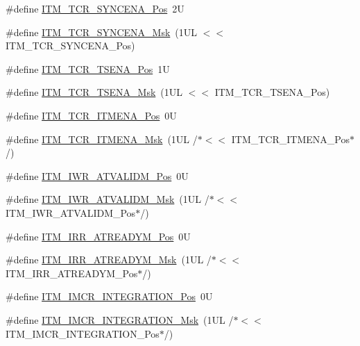 \begin{DoxyCompactItemize}
\#define \hyperlink{group___c_m_s_i_s___i_t_m_gaa93a1147a39fc63980d299231252a30e}{I\+T\+M\+\_\+\+T\+C\+R\+\_\+\+S\+Y\+N\+C\+E\+N\+A\+\_\+\+Pos}~2U
\item 
\#define \hyperlink{group___c_m_s_i_s___i_t_m_gac89b74a78701c25b442105d7fe2bbefb}{I\+T\+M\+\_\+\+T\+C\+R\+\_\+\+S\+Y\+N\+C\+E\+N\+A\+\_\+\+Msk}~(1\+U\+L $<$$<$ I\+T\+M\+\_\+\+T\+C\+R\+\_\+\+S\+Y\+N\+C\+E\+N\+A\+\_\+\+Pos)
\item 
\#define \hyperlink{group___c_m_s_i_s___i_t_m_ga5aa381845f810114ab519b90753922a1}{I\+T\+M\+\_\+\+T\+C\+R\+\_\+\+T\+S\+E\+N\+A\+\_\+\+Pos}~1U
\item 
\#define \hyperlink{group___c_m_s_i_s___i_t_m_ga436b2e8fa24328f48f2da31c00fc9e65}{I\+T\+M\+\_\+\+T\+C\+R\+\_\+\+T\+S\+E\+N\+A\+\_\+\+Msk}~(1\+U\+L $<$$<$ I\+T\+M\+\_\+\+T\+C\+R\+\_\+\+T\+S\+E\+N\+A\+\_\+\+Pos)
\item 
\#define \hyperlink{group___c_m_s_i_s___i_t_m_ga3286b86004bce7ffe17ee269f87f8d9d}{I\+T\+M\+\_\+\+T\+C\+R\+\_\+\+I\+T\+M\+E\+N\+A\+\_\+\+Pos}~0U
\item 
\#define \hyperlink{group___c_m_s_i_s___i_t_m_ga7dd53e3bff24ac09d94e61cb595cb2d9}{I\+T\+M\+\_\+\+T\+C\+R\+\_\+\+I\+T\+M\+E\+N\+A\+\_\+\+Msk}~(1\+U\+L /$\ast$$<$$<$ I\+T\+M\+\_\+\+T\+C\+R\+\_\+\+I\+T\+M\+E\+N\+A\+\_\+\+Pos$\ast$/)
\item 
\#define \hyperlink{group___c_m_s_i_s___i_t_m_ga04d3f842ad48f6a9127b4cecc963e1d7}{I\+T\+M\+\_\+\+I\+W\+R\+\_\+\+A\+T\+V\+A\+L\+I\+D\+M\+\_\+\+Pos}~0U
\item 
\#define \hyperlink{group___c_m_s_i_s___i_t_m_ga67b969f8f04ed15886727788f0e2ffd7}{I\+T\+M\+\_\+\+I\+W\+R\+\_\+\+A\+T\+V\+A\+L\+I\+D\+M\+\_\+\+Msk}~(1\+U\+L /$\ast$$<$$<$ I\+T\+M\+\_\+\+I\+W\+R\+\_\+\+A\+T\+V\+A\+L\+I\+D\+M\+\_\+\+Pos$\ast$/)
\item 
\#define \hyperlink{group___c_m_s_i_s___i_t_m_ga259edfd1d2e877a62e06d7a240df97f4}{I\+T\+M\+\_\+\+I\+R\+R\+\_\+\+A\+T\+R\+E\+A\+D\+Y\+M\+\_\+\+Pos}~0U
\item 
\#define \hyperlink{group___c_m_s_i_s___i_t_m_ga3dbc3e15f5bde2669cd8121a1fe419b9}{I\+T\+M\+\_\+\+I\+R\+R\+\_\+\+A\+T\+R\+E\+A\+D\+Y\+M\+\_\+\+Msk}~(1\+U\+L /$\ast$$<$$<$ I\+T\+M\+\_\+\+I\+R\+R\+\_\+\+A\+T\+R\+E\+A\+D\+Y\+M\+\_\+\+Pos$\ast$/)
\item 
\#define \hyperlink{group___c_m_s_i_s___i_t_m_ga08de02bf32caf48aaa29f7c68ff5d755}{I\+T\+M\+\_\+\+I\+M\+C\+R\+\_\+\+I\+N\+T\+E\+G\+R\+A\+T\+I\+O\+N\+\_\+\+Pos}~0U
\item 
\#define \hyperlink{group___c_m_s_i_s___i_t_m_ga8838bd3dd04c1a6be97cd946364a3fd2}{I\+T\+M\+\_\+\+I\+M\+C\+R\+\_\+\+I\+N\+T\+E\+G\+R\+A\+T\+I\+O\+N\+\_\+\+Msk}~(1\+U\+L /$\ast$$<$$<$ I\+T\+M\+\_\+\+I\+M\+C\+R\+\_\+\+I\+N\+T\+E\+G\+R\+A\+T\+I\+O\+N\+\_\+\+Pos$\ast$/)

\end{DoxyCompactItemize}
